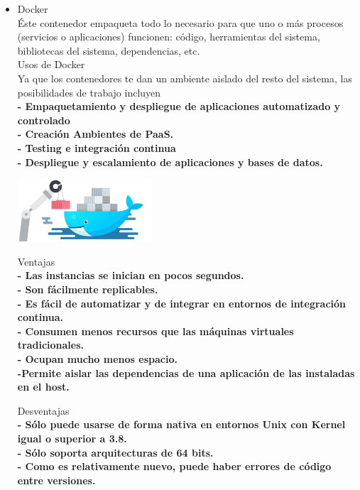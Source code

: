 \documentclass[twoside,twocolumn]{article}
\begin{document}
\begin{itemize}
\item Docker
\\ Éste contenedor empaqueta todo lo necesario para que uno o más procesos (servicios o
aplicaciones) funcionen: código, herramientas del sistema, bibliotecas del sistema, dependencias,
etc.
\\Usos de Docker
\\Ya que los contenedores te dan un ambiente aislado del resto del sistema, las posibilidades de
trabajo incluyen
\\ \textbf{- Empaquetamiento y despliegue de aplicaciones automatizado y controlado}
\\ \textbf{- Creación Ambientes de PaaS.}
\\ \textbf{- Testing e integración continua}
\\ \textbf{- Despliegue y escalamiento de aplicaciones y bases de datos.}

\begin{center}
	\includegraphics[width=5cm]{./Imagenes/docker} 
	\end{center}

Ventajas
\\ \textbf{- Las instancias se inician en pocos segundos.}
\\ \textbf{- Son fácilmente replicables.}
\\ \textbf{- Es fácil de automatizar y de integrar en entornos de integración continua.}
\\ \textbf{- Consumen menos recursos que las máquinas virtuales tradicionales.}
\\ \textbf{- Ocupan mucho menos espacio.}
\\ \textbf{-Permite aislar las dependencias de una aplicación de las instaladas en el host.}

Desventajas
\\ \textbf{- Sólo puede usarse de forma nativa en entornos Unix con Kernel igual o superior a 3.8.}
\\ \textbf{- Sólo soporta arquitecturas de 64 bits.}
\\ \textbf{- Como es relativamente nuevo, puede haber errores de código entre versiones.}
\end{itemize} 
\end{document}

